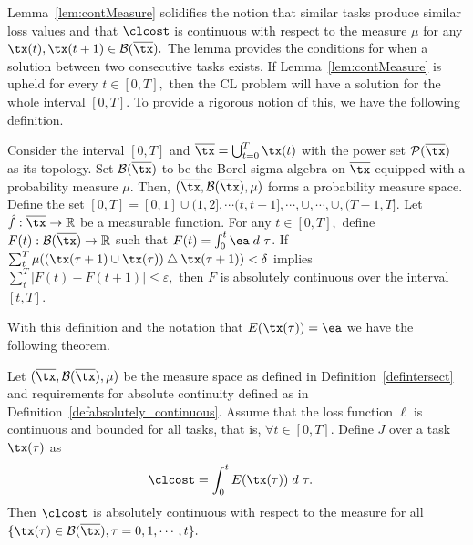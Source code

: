 Lemma~\ref{lem:contMeasure} solidifies the notion that similar 
tasks produce similar loss values and that $\clcost$ is continuous with respect 
to the measure $\mu$ for any $ \tx(t), \tx(t+1) \in \mathcal{B}(\overline{\tx}).$  The  lemma provides the conditions for when a solution between two consecutive tasks  exists. If  Lemma~\ref{lem:contMeasure} is upheld for every $t \in [0,T],$ then the CL problem will have a solution for the whole interval $[0,T].$ To provide a rigorous notion of this, we have the following definition.
\begin{definition}
    \label{defabsolutely_continuous}
     Consider the interval $[0,T]$ and  $\overline{\tx} = \bigcup_{t=0}^T \tx(t)$ with the power set $\mathcal{P(\overline{\tx})}$ as its topology. Set $\mathcal{B(\overline{\tx})}$ to be the Borel sigma algebra on $\overline{\tx}$ equipped with a probability measure  $\mu.$ Then, $(\overline{\tx},\mathcal{B}(\overline{\tx}), \mu)$ forms a probability measure space. Define the set $[0,T] = [0,1] \cup  (1, 2], \cdots (t, t+1], \cdots, \cup, \cdots, \cup, (T-1, T].$  Let $\hat{f}: \overline{\tx}\rightarrow \mathbb{R}$ be a measurable function. For any 
     $t \in [0,T],$ define $F(t):\mathcal{B}(\overline{\tx}) \rightarrow \mathbb{R}$ such that  $F(t) = \int_0^t \ea \;  d~\tau$. If  $\sum_{t}^{T} \mu((\tx(\tau+1)\cup \tx(\tau)) \bigtriangleup \tx(\tau+1))<\delta$ implies $\sum_{t}^{T} \left\vert F(t)-F(t+1) \right\vert \leq \varepsilon,$ then $F$ is absolutely continuous over the interval $[t,T].$
 \end{definition}
With this definition and the notation that $E(\tx(\tau)) = \ea$ we have the following theorem.
\begin{theorem}\label{thm:contMeasure}
    Let $(\overline{\tx},\mathcal{B}(\overline{\tx}), \mu)$ be the measure space as 
    defined  in Definition~\ref{defintersect} and requirements for absolute continuity defined as in Definition~\ref{defabsolutely_continuous}. Assume that the loss function $\ell$ is continuous 
    and bounded for all tasks, that is, $\forall t \in [0,T].$ 
    Define $J$ over a task $\tx(\tau)$ as
    \begin{align}
   \clcost & = \int_0^t  E(\tx(\tau)) \;  d~\tau .
    \end{align}
    Then $ \clcost$ is absolutely continuous with respect to the measure for all $\{ \tx(\tau) \in \mathcal{B}(\overline{\tx}), \tau =0,1, \cdots, t \}.$
\end{theorem}
